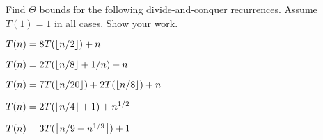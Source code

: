 \documentclass[12pt,twoside]{article}
\begin{document}




\begin{problem}{25}
Find $\Theta$ bounds for the following divide-and-conquer recurrences.
Assume $T(1) = 1$ in all cases.  Show your work.

\begin{problemparts}

 $T(n) = 8T(\left\lfloor n/2\right\rfloor) + n$

 $T(n) = 2T(\left\lfloor n/8\right\rfloor + 1/n)+n$

 $T(n) = 7T(\left\lfloor n/20\right\rfloor) + 2T(\left\lfloor n/8\right\rfloor) + n$

 $T(n) = 2T(\left\lfloor n/4\right\rfloor+1)+n^{1/2}$

 $T(n) = 3T(\left\lfloor n/9+n^{1/9}\right\rfloor) + 1$

\end{problemparts}

\end{problem}
\end{document}
